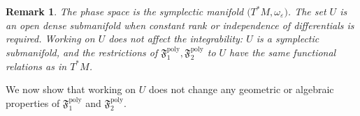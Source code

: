 \documentclass[11pt]{amsart}
\theoremstyle{definition}
\theoremstyle{plain}
\newtheorem{remark}[theorem]{Remark}
\theoremstyle{conclusion}
\begin{document}
\begin{remark}  
The phase space is the symplectic manifold $\big(T^*M,\omega_\varepsilon\big)$.  The set $U$ is an open dense submanifold when constant rank or independence of differentials is required. Working on $U$ does not affect the integrability: $U$ is a symplectic submanifold, and the restrictions of $\mathfrak{F}_1^{\mathrm{poly}},\mathfrak{F}_2^{\mathrm{poly}} $ to $U$ have the same functional relations as in $T^*M$. %
\end{remark}

 We now show that working on $U$ does not change any geometric or algebraic properties of $\mathfrak{F}_1^{\mathrm{poly}}$ and $\mathfrak{F}_2^{\mathrm{poly}} $.
\end{document}
